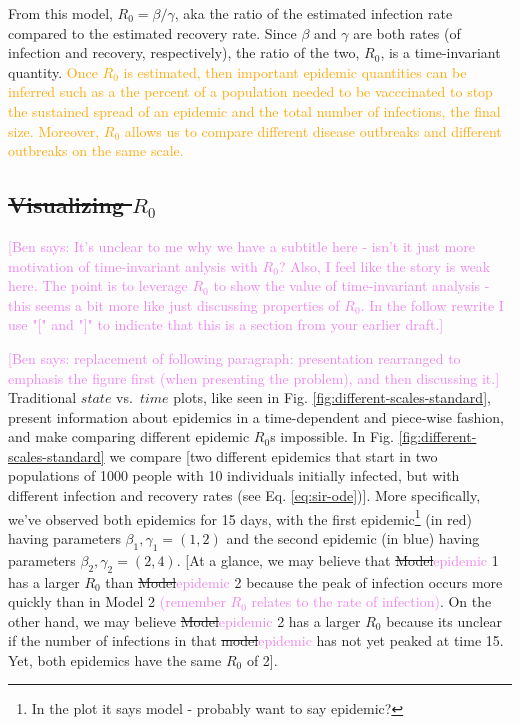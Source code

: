 \documentclass[
  shortnames]{jss}
\begin{document}
From this model, \(R_0 = \beta/\gamma\), aka the ratio of the estimated
infection rate compared to the estimated recovery rate. Since \(\beta\)
and \(\gamma\) are both rates (of infection and recovery, respectively),
the ratio of the two, \(R_0\), is a time-invariant quantity.
\textcolor{orange}{Once $R_0$ is estimated, then important epidemic quantities can be inferred such as a the percent of a population needed to be vacccinated to stop the sustained spread of an epidemic and the total number of infections, the final size.  Moreover, $R_0$ allows us to compare different disease outbreaks and different outbreaks on the same scale.  }

\subsection[visualizing r0]{\sout{ Visualizing $R_0$}}\label{vis-r0}

\textcolor{violet}{[Ben says: It's unclear to me why we have a subtitle here - isn't it just more motivation of time-invariant anlysis with $R_0$? Also, I feel like the story is weak here. The point is to leverage $R_0$ to show the value of time-invariant analysis - this seems a bit more like just discussing properties of $R_0$. In the follow rewrite I use "[" and "]" to indicate that this is a section from your earlier draft.]}

\textcolor{violet}{[Ben says: replacement of following paragraph: presentation rearranged to emphasis the figure first (when presenting the problem), and then discussing it.]}
Traditional \(state\) vs.~\(time\) plots, like seen in Fig.
\ref{fig:different-scales-standard}, present information about epidemics
in a time-dependent and piece-wise fashion, and make comparing different
epidemic \(R_0\)s impossible. In Fig.
\ref{fig:different-scales-standard} we compare {[}two different
epidemics that start in two populations of 1000 people with 10
individuals initially infected, but with different infection and
recovery rates (see Eq. \ref{eq:sir-ode}){]}. More specifically, we've
observed both epidemics for 15 days, with the first
epidemic\footnote{In the plot it says model - probably want to say epidemic?}
(in red) having parameters \(\beta_1, \gamma_1 = (1,2)\) and the second
epidemic (in blue) having parameters \(\beta_2, \gamma_2 = (2,4)\).
{[}At a glance, we may believe that
\sout{Model}\textcolor{violet}{epidemic} 1 has a larger \(R_0\) than
\sout{Model}\textcolor{violet}{epidemic} 2 because the peak of infection
occurs more quickly than in Model 2
\textcolor{violet}{(remember $R_0$ relates to the rate of infection)}.
On the other hand, we may believe
\sout{Model}\textcolor{violet}{epidemic} 2 has a larger \(R_0\) because
its unclear if the number of infections in that
\sout{model}\textcolor{violet}{epidemic} has not yet peaked at time 15.
Yet, both epidemics have the same \(R_0\) of 2{]}.
\end{document}
